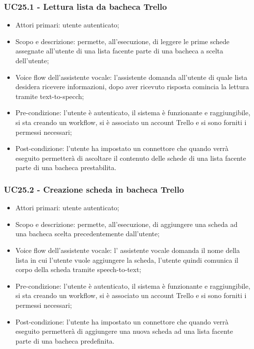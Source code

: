 \subsubsection{UC25.1 - Lettura lista da bacheca Trello}
\begin{itemize}
	\item  Attori primari: utente autenticato;
	\item  Scopo e descrizione: permette, all'esecuzione, di leggere le prime schede assegnate all'utente di una lista facente parte di una bacheca a scelta dell'utente;
	\item  Voice flow dell'assistente vocale: l'assistente domanda all'utente di quale lista desidera ricevere informazioni, dopo aver ricevuto risposta comincia la lettura tramite text-to-specch;
	\item  Pre-condizione: l'utente è autenticato, il sistema è funzionante e raggiungibile, si sta creando un workflow, si è associato un account Trello e si sono forniti i permessi necessari;
	\item  Post-condizione: l'utente ha impostato un connettore che quando verrà eseguito permetterà di ascoltare il contenuto delle schede di una lista facente parte di una bacheca prestabilita.
\end{itemize}
\subsubsection{UC25.2 - Creazione scheda in bacheca Trello}
\begin{itemize}
	\item  Attori primari: utente autenticato;
	\item  Scopo e descrizione: permette, all'esecuzione, di aggiungere una scheda ad una bacheca scelta precedentemente dall'utente;
	\item  Voice flow dell'assistente vocale: l' assistente vocale domanda il nome della lista in cui l'utente vuole aggiungere la scheda, l'utente quindi comunica il corpo della scheda tramite speech-to-text;
	\item  Pre-condizione: l'utente è autenticato, il sistema è funzionante e raggiungibile, si sta creando un workflow, si è associato un account Trello e si sono forniti i permessi necessari;
	\item  Post-condizione: l'utente ha impostato un connettore che quando verrà eseguito permetterà di aggiungere una nuova scheda ad una lista facente parte di una bacheca predefinita.
\end{itemize}
